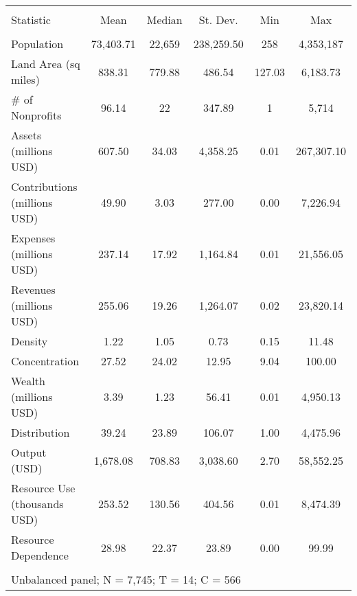 
\begin{table}[!htbp] \centering 
  \caption{} 
  \label{} 
\begin{tabular}{@{\extracolsep{5pt}}lccccc} 
\\[-1.8ex]\hline 
\hline \\[-1.8ex] 
Statistic & \multicolumn{1}{c}{Mean} & \multicolumn{1}{c}{Median} & \multicolumn{1}{c}{St. Dev.} & \multicolumn{1}{c}{Min} & \multicolumn{1}{c}{Max} \\ 
\hline \\[-1.8ex] 
\quad Population & 73,403.71 & 22,659 & 238,259.50 & 258 & 4,353,187 \\ 
\quad Land Area (sq miles) & 838.31 & 779.88 & 486.54 & 127.03 & 6,183.73 \\ 
\quad \# of Nonprofits & 96.14 & 22 & 347.89 & 1 & 5,714 \\ 
\quad Assets (millions USD) & 607.50 & 34.03 & 4,358.25 & 0.01 & 267,307.10 \\ 
\quad Contributions (millions USD) & 49.90 & 3.03 & 277.00 & 0.00 & 7,226.94 \\ 
\quad Expenses (millions USD) & 237.14 & 17.92 & 1,164.84 & 0.01 & 21,556.05 \\ 
\quad Revenues (millions USD) & 255.06 & 19.26 & 1,264.07 & 0.02 & 23,820.14 \\ 
\quad Density & 1.22 & 1.05 & 0.73 & 0.15 & 11.48 \\ 
\quad Concentration & 27.52 & 24.02 & 12.95 & 9.04 & 100.00 \\ 
\quad Wealth (millions USD) & 3.39 & 1.23 & 56.41 & 0.01 & 4,950.13 \\ 
\quad Distribution & 39.24 & 23.89 & 106.07 & 1.00 & 4,475.96 \\ 
\quad Output (USD) & 1,678.08 & 708.83 & 3,038.60 & 2.70 & 58,552.25 \\ 
\quad Resource Use (thousands USD) & 253.52 & 130.56 & 404.56 & 0.01 & 8,474.39 \\ 
\quad Resource Dependence & 28.98 & 22.37 & 23.89 & 0.00 & 99.99 \\ 
\hline \\[-1.8ex] 
\multicolumn{6}{l}{Unbalanced panel; N = 7,745; T = 14; C = 566} \\ 
\end{tabular} 
\end{table} 
